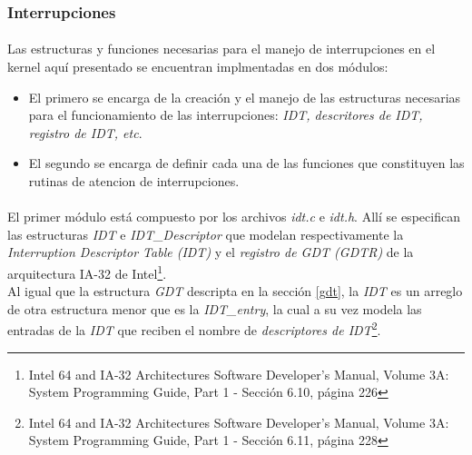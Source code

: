 \documentclass[11pt, a4paper]{article}
\begin{document}
\subsubsection{Interrupciones}
\label{int}
	\paragraph{}
	Las estructuras y funciones necesarias para el manejo de interrupciones en el kernel aquí presentado se encuentran implmentadas en dos módulos: 
	\begin{itemize}
		\item El primero se encarga de la creación y el manejo de las estructuras necesarias para el funcionamiento de las interrupciones: \textit{IDT, descritores de IDT, registro de IDT, etc}.
		\item El segundo se encarga de definir cada una de las funciones que constituyen las rutinas de atencion de interrupciones.
	\end{itemize}
	
	\paragraph{}
	El primer módulo está compuesto por los archivos \textit{idt.c} e \textit{idt.h}. Allí se especifican las estructuras \textit{IDT} e \textit{IDT\_Descriptor} que modelan respectivamente la \textit{Interruption Descriptor Table (IDT)} y el \textit{registro de GDT (GDTR)} de la arquitectura IA-32 de Intel\footnote{Intel 64 and IA-32 Architectures Software Developer’s Manual, Volume 3A: System Programming Guide, Part 1 - Sección 6.10, página 226}.\\
	Al igual que la estructura \textit{GDT} descripta en la sección \ref{gdt}, la \textit{IDT} es un arreglo de otra estructura menor que es la \textit{IDT\_entry}, la cual a su vez modela las entradas de la \textit{IDT} que reciben el nombre  de \textit{descriptores de IDT}\footnote{Intel 64 and IA-32 Architectures Software Developer’s Manual, Volume 3A: System Programming Guide, Part 1 - Sección 6.11, página 228}.
	
\end{document}
